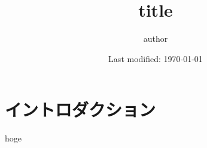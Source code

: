 \documentclass[
  unicode,a4paper,10pt,
  xcolor = {dvipsnames,svgnames},
  hyperref ={colorlinks=true,citecolor=Navy,linkcolor=NavyBlue,urlcolor=purple},
  ja=standard,lualatex
]{beamer}
\begin{document}
\title{
  title
}
\author{
  author
}
\date{Last modified: \today}

\begin{frame}
  \titlepage
\end{frame}


\section{イントロダクション}

\begin{frame}
  \huge \secname
\end{frame}

\begin{frame}

  hoge

\end{frame}
































%   
%   



\end{document}
